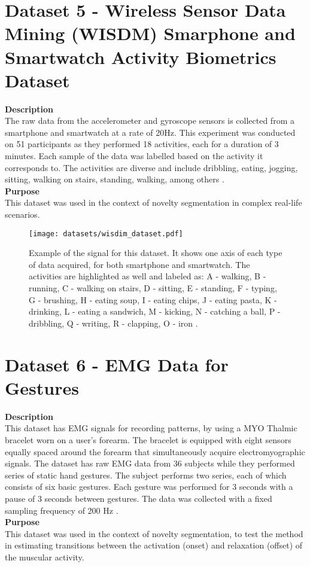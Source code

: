 \section{Dataset 5 - Wireless Sensor Data Mining (WISDM) Smarphone and Smartwatch Activity Biometrics Dataset}
\label{dat:dataset5}
\textbf{Description}\hfill\\
The raw data from the accelerometer and gyroscope sensors is collected from a smartphone and smartwatch at a rate of 20Hz. This experiment was conducted on 51 participants as they performed 18 activities, each for a duration of 3 minutes. Each sample of the data was labelled based on the activity it corresponds to. The activities are diverse and include dribbling, eating, jogging, sitting, walking on stairs, standing, walking, among others \cite{dataset4}.\\
\textbf{Purpose}\hfill\\
This dataset was used in the context of novelty segmentation in complex real-life scenarios.

\begin{figure}
\centering
\texttt{[image: datasets/wisdim\_dataset.pdf]}
\caption{Example of the signal for this dataset. It shows one axis of each type of data acquired, for both smartphone and smartwatch. The activities are highlighted as well and labeled as: A - walking, B - running, C - walking on stairs, D - sitting, E - standing, F -   typing, G - brushing, H - eating soup, I - eating chips, J - eating pasta, K - drinking, L - eating a sandwich, M - kicking, N - catching a ball, P - dribbling, Q - writing, R - clapping, O - iron \cite{dataset4}.}
\label{fig:wisdim_data}
\end{figure}

\section{Dataset 6 - EMG Data for Gestures}
\label{dat:dataset6}
\textbf{Description}\hfill\\
This dataset has EMG signals for recording patterns, by using a MYO Thalmic bracelet worn on a user's forearm. The bracelet is equipped with eight sensors equally spaced around the forearm that simultaneously acquire electromyographic signals. The dataset has raw EMG data from 36 subjects while they performed series of static hand gestures. The subject performs two series, each of which consists of six basic gestures. Each gesture was performed for 3 seconds with a pause of 3 seconds between gestures. The data was collected with a fixed sampling frequency of 200 Hz \cite{dataset5}.\\
\textbf{Purpose}\hfill\\
This dataset was used in the context of novelty segmentation, to test the method in estimating transitions between the activation (onset) and relaxation (offset) of the muscular activity.

